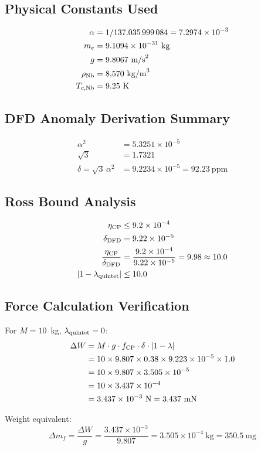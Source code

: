 \documentclass[12pt,a4paper]{article}
\theoremstyle{definition}
\theoremstyle{remark}
\begin{document}
\subsection{Physical Constants Used}

\begin{align}
\alpha &= 1/137.035\,999\,084 = 7.2974 \times 10^{-3} \\
m_e &= 9.1094 \times 10^{-31}~\text{kg} \\
g &= 9.8067~\text{m/s}^2 \\
\rho_{\rm Nb} &= 8{,}570~\text{kg/m}^3 \\
T_{c,\rm Nb} &= 9.25~\text{K}
\end{align}

\subsection{DFD Anomaly Derivation Summary}

\begin{align}
\alpha^2 &= 5.3251 \times 10^{-5} \\
\sqrt{3} &= 1.7321 \\
\delta = \sqrt{3}\,\alpha^2 &= 9.2234 \times 10^{-5} = 92.23~\text{ppm}
\end{align}

\subsection{Ross Bound Analysis}

\begin{align}
\eta_{\rm CP} &\leq 9.2 \times 10^{-4} \\
\delta_{\rm DFD} &= 9.22 \times 10^{-5} \\
\frac{\eta_{\rm CP}}{\delta_{\rm DFD}} &= \frac{9.2 \times 10^{-4}}{9.22 \times 10^{-5}} = 9.98 \approx 10.0 \\
|1 - \lambda_{\rm quintet}| &\leq 10.0
\end{align}

\subsection{Force Calculation Verification}

For $M = 10$~kg, $\lambda_{\rm quintet} = 0$:
\begin{align}
\Delta W &= M \cdot g \cdot f_{\rm CP} \cdot \delta \cdot |1 - \lambda| \\
&= 10 \times 9.807 \times 0.38 \times 9.223 \times 10^{-5} \times 1.0 \\
&= 10 \times 9.807 \times 3.505 \times 10^{-5} \\
&= 10 \times 3.437 \times 10^{-4} \\
&= 3.437 \times 10^{-3}~\text{N} = 3.437~\text{mN}
\end{align}

Weight equivalent:
\begin{equation}
\Delta m_f = \frac{\Delta W}{g} = \frac{3.437 \times 10^{-3}}{9.807}
= 3.505 \times 10^{-4}~\text{kg} = 350.5~\text{mg}
\end{equation}
\end{document}
